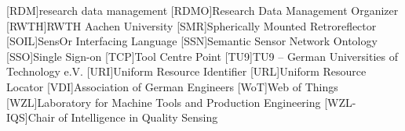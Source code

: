 \begin{acronym}[JSONP]
[RDM]{research data management}
[RDMO]{Research Data Management Organizer}
[RWTH]{RWTH Aachen University}
[SMR]{Spherically Mounted Retroreflector}
[SOIL]{SensOr Interfacing Language}
[SSN]{Semantic Sensor Network Ontology}
[SSO]{Single Sign-on}
[TCP]{Tool Centre Point}
[TU9]{TU9 – German Universities of Technology e.V.}
[URI]{Uniform Resource Identifier}
[URL]{Uniform Resource Locator}
[VDI]{Association of German Engineers}
[WoT]{Web of Things}
[WZL]{Laboratory for Machine Tools and Production Engineering}
[WZL-IQS]{Chair of Intelligence in Quality Sensing}
\end{acronym}


